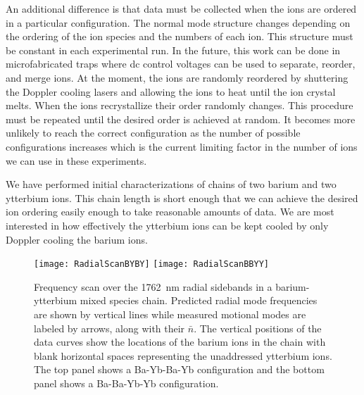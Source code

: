An additional difference is that data must be collected when the ions are ordered in a particular configuration.  The normal mode structure changes depending on the ordering of the ion species and the numbers of each ion.  This structure must be constant in each experimental run.  In the future, this work can be done in microfabricated traps where dc control voltages can be used to separate, reorder, and merge ions.  At the moment, the ions are randomly reordered by shuttering the Doppler cooling lasers and allowing the ions to heat until the ion crystal melts.  When the ions recrystallize their order randomly changes.  This procedure must be repeated until the desired order is achieved at random.   It becomes more unlikely to reach the correct configuration as the number of possible configurations increases which is the current limiting factor in the number of ions we can use in these experiments.

We have performed initial characterizations of chains of two barium and two ytterbium ions.  This chain length is short enough that we can achieve the desired ion ordering easily enough to take reasonable amounts of data.  We are most interested in how effectively the ytterbium ions can be kept cooled by only Doppler cooling the barium ions.

\begin{figure}
	\centering
	\texttt{[image: RadialScanBYBY]}
	\texttt{[image: RadialScanBBYY]}
	\caption[Frequency scan over 1762~nm radial sidebands in a barium-ytterbium chain]{Frequency scan over the 1762~nm radial sidebands in a barium-ytterbium mixed species chain.  Predicted radial mode frequencies are shown by vertical lines while measured motional modes are labeled by arrows, along with their $\bar{n}$.  The vertical positions of the data curves show the locations of the barium ions in the chain with blank horizontal spaces representing the unaddressed ytterbium ions.  The top panel shows a Ba-Yb-Ba-Yb configuration and the bottom panel shows a Ba-Ba-Yb-Yb configuration.}
	\label{fig:radial-byby}
\end{figure}

